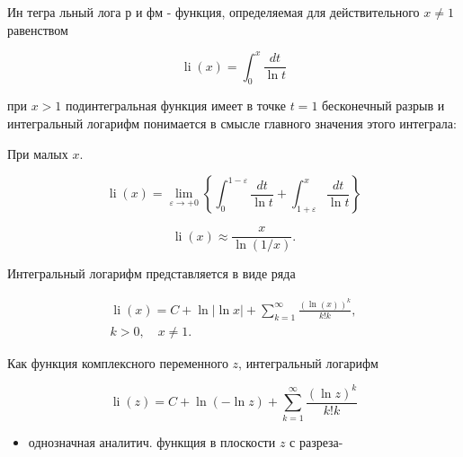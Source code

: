 \documentclass[10pt]{article}
\begin{document}
Ин тегра льный лога р и фм - функция, определяемая для действительного $x \neq 1$ равенством



\[

\operatorname{li}(x)=\int_{0}^{x} \frac{d t}{\ln t}

\]



при $x>1$ подинтегральная функция имеет в точке $t=1$ бесконечный разрыв и интегральный логарифм понимается в смысле главного значения этого интеграла:



При малых $x$.



\[

\operatorname{li}(x)=\lim _{\varepsilon \rightarrow+0}\left\{\int_{0}^{1-\varepsilon} \frac{d t}{\ln t}+\int_{1+\varepsilon}^{x} \frac{d t}{\ln t}\right\}

\]



\[

\operatorname{li}(x) \approx \frac{x}{\ln (1 / x)} .

\]



Интегральный логарифм представляется в виде ряда



\[

\begin{gathered}

\operatorname{li}(x)=C+\ln |\ln x|+\sum_{k=1}^{\infty} \frac{(\ln (x))^{k}}{k ! k}, \\

k>0, \quad x \neq 1 .

\end{gathered}

\]



Как функция комплексного переменного $z$, интегральный логарифм



\[

\operatorname{li}(z)=C+\ln (-\ln z)+\sum_{k=1}^{\infty} \frac{(\ln z)^{k}}{k ! k}

\]



\begin{itemize}

  \item однозначная аналитич. функщия в плоскости $z$ с разреза-

\end{itemize}
\end{document}
